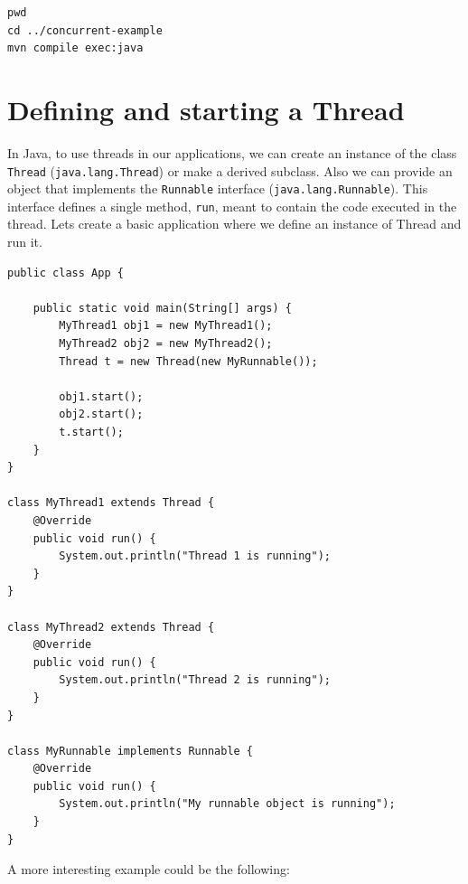 \documentclass[openany, a4paper]{book}
\theoremstyle{break}
\theoremstyle{example}
\theoremstyle{note}
\theoremstyle{break}
\theoremstyle{exercise}
\begin{document}
\begin{verbatim}
pwd
cd ../concurrent-example
mvn compile exec:java
\end{verbatim}


\section{Defining and starting a Thread}
\label{sec:org8ff3afe}

In Java, to use threads in our applications, we can create an instance of
the class \texttt{Thread} (\texttt{java.lang.Thread}) or make a derived subclass. Also we can
provide an object that implements the \texttt{Runnable} interface
(\texttt{java.lang.Runnable}). This interface defines a single method, \texttt{run}, meant to
contain the code executed in the thread. Lets create a basic application
where we define an instance of Thread and run it.

\begin{verbatim}
public class App {

    public static void main(String[] args) {
        MyThread1 obj1 = new MyThread1();
        MyThread2 obj2 = new MyThread2();
        Thread t = new Thread(new MyRunnable());

        obj1.start();
        obj2.start();
        t.start();
    }
}

class MyThread1 extends Thread {
    @Override
    public void run() {
        System.out.println("Thread 1 is running");
    }
}

class MyThread2 extends Thread {
    @Override
    public void run() {
        System.out.println("Thread 2 is running");
    }
}

class MyRunnable implements Runnable {
    @Override
    public void run() {
        System.out.println("My runnable object is running");
    }
}
\end{verbatim}

A more interesting example could be the following:
\end{document}
